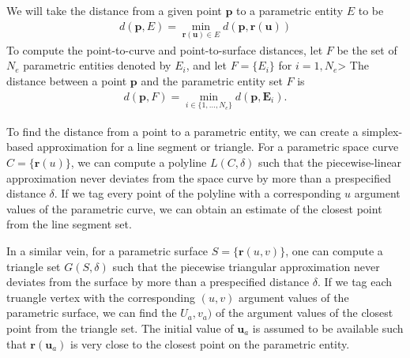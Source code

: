 We will take the distance from a given point $\bm{p}$ to a parametric entity $E$ to be 
%
\begin{align}
	d(\bm{p}, E)  = \min_{\bm{r}(\bm{u}) \in E} d(\bm{p}, \bm{r}(\bm{u}))
\end{align}
 To compute the point-to-curve and point-to-surface distances, let $F$ be the set of $N_e$ parametric entities denoted by $E_i$, and let $F = \{E_i\}$ for $i = 1, N_e$> The distance between a point $\bm{p}$ and the parametric entity set $F$ is
 \begin{align}
 	d(\bm{p}, F) = \min_{i\in \{1,\ldots, N_e\}} d(\bm{p}, \bm{E}_i).
 \end{align}
 
 To find the distance from a point to a parametric entity, we can create a simplex-based approximation for \eg a line segment or triangle. For a parametric space curve $C =\{\bm{r}(u)\}$, we can compute a polyline $L(C, \delta)$ such that the piecewise-linear approximation never deviates from the space curve by more than a prespecified distance $\delta$. If we tag every point of the polyline with a corresponding $u$ argument values of the parametric curve, we can obtain an estimate of the closest point from the line segment set.
 
 In a similar vein, for a parametric surface $S = \{\bm{r}(u, v)\}$, one can compute a triangle set $G(S, \delta)$ such that the piecewise triangular approximation never deviates from the surface by more than a prespecified distance $\delta$. If we tag each truangle vertex with the corresponding $(u, v)$ argument values of the parametric surface, we can find the $U_a, v_a)$ of the argument values of the closest point from the triangle set. The initial value of $\bm{u}_a$ is assumed to be available such that $\bm{r}(\bm{u}_a)$ is very close to the closest point on the parametric entity.
 
